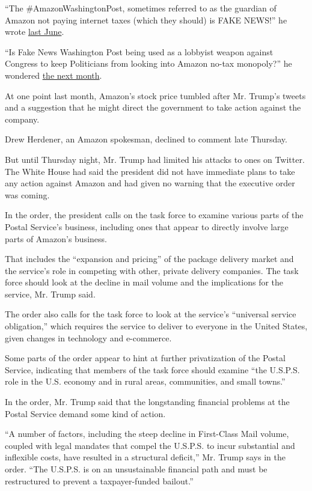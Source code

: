 ``The \#AmazonWashingtonPost, sometimes referred to as the guardian of
Amazon not paying internet taxes (which they should) is FAKE NEWS!'' he
wrote
\href{https://twitter.com/realdonaldtrump/status/880049704620494848}{last
June}.

``Is Fake News Washington Post being used as a lobbyist weapon against
Congress to keep Politicians from looking into Amazon no-tax monopoly?''
he wondered
\href{https://twitter.com/realdonaldtrump/status/889675644396867584}{the
next month}.

At one point last month, Amazon's stock price tumbled after Mr. Trump's
tweets and a suggestion that he might direct the government to take
action against the company.

Drew Herdener, an Amazon spokesman, declined to comment late Thursday.

But until Thursday night, Mr. Trump had limited his attacks to ones on
Twitter. The White House had said the president did not have immediate
plans to take any action against Amazon and had given no warning that
the executive order was coming.

In the order, the president calls on the task force to examine various
parts of the Postal Service's business, including ones that appear to
directly involve large parts of Amazon's business.

That includes the ``expansion and pricing'' of the package delivery
market and the service's role in competing with other, private delivery
companies. The task force should look at the decline in mail volume and
the implications for the service, Mr. Trump said.

The order also calls for the task force to look at the service's
``universal service obligation,'' which requires the service to deliver
to everyone in the United States, given changes in technology and
e-commerce.

Some parts of the order appear to hint at further privatization of the
Postal Service, indicating that members of the task force should examine
``the U.S.P.S. role in the U.S. economy and in rural areas, communities,
and small towns.''

In the order, Mr. Trump said that the longstanding financial problems at
the Postal Service demand some kind of action.

``A number of factors, including the steep decline in First-Class Mail
volume, coupled with legal mandates that compel the U.S.P.S. to incur
substantial and inflexible costs, have resulted in a structural
deficit,'' Mr. Trump says in the order. ``The U.S.P.S. is on an
unsustainable financial path and must be restructured to prevent a
taxpayer-funded bailout.''

